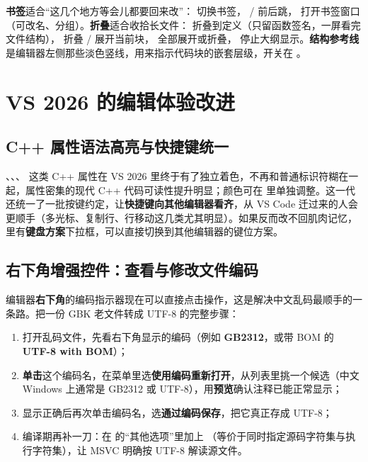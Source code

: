 \textbf{书签}适合“这几个地方等会儿都要回来改”： 切换书签， /  前后跳， 打开书签窗口（可改名、分组）。\textbf{折叠}适合收拾长文件： 折叠到定义（只留函数签名，一屏看完文件结构）， 折叠 / 展开当前块， 全部展开或折叠， 停止大纲显示。\textbf{结构参考线}是编辑器左侧那些淡色竖线，用来指示代码块的嵌套层级，开关在 。

\section{VS 2026 的编辑体验改进}
\subsection{C++ 属性语法高亮与快捷键统一}

\code{[[nodiscard]]}、、\code{[[likely]]}、\code{[[deprecated]]} 这类 C++ 属性在 VS 2026 里终于有了独立着色，不再和普通标识符糊在一起，属性密集的现代 C++ 代码可读性提升明显；颜色可在  里单独调整。这一代还统一了一批按键约定，让\textbf{快捷键向其他编辑器看齐}，从 VS Code 迁过来的人会更顺手（多光标、复制行、行移动这几类尤其明显）。如果反而改不回肌肉记忆， 里有\textbf{键盘方案}下拉框，可以直接切换到其他编辑器的键位方案。

\subsection{右下角增强控件：查看与修改文件编码}

编辑器\textbf{右下角}的编码指示器现在可以直接点击操作，这是解决中文乱码最顺手的一条路。把一份 GBK 老文件转成 UTF-8 的完整步骤：

\begin{enumerate}
  \item 打开乱码文件，先看右下角显示的编码（例如 \textbf{GB2312}，或带 BOM 的 \textbf{UTF-8 with BOM}）；
  \item \textbf{单击}这个编码名，在菜单里选\textbf{使用编码重新打开}，从列表里挑一个候选（中文 Windows 上通常是 GB2312 或 UTF-8），用\textbf{预览}确认注释已能正常显示；
  \item 显示正确后再次单击编码名，选\textbf{通过编码保存}，把它真正存成 UTF-8；
  \item 编译期再补一刀：在  的“其他选项”里加上 （等价于同时指定源码字符集与执行字符集），让 MSVC 明确按 UTF-8 解读源文件。
\end{enumerate}

